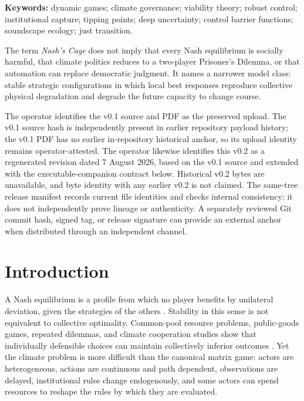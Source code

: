 \documentclass[11pt,a4paper]{article}
\numberwithin{equation}{section}
\theoremstyle{definition}
\theoremstyle{plain}
\theoremstyle{remark}
\begin{document}
\noindent\textbf{Keywords:} dynamic games; climate governance; viability theory; robust control; institutional capture; tipping points; deep uncertainty; control barrier functions; soundscape ecology; just transition.

\vspace{0.8em}
\begin{boundarybox}
The term \emph{Nash's Cage} does not imply that every Nash equilibrium is socially harmful, that climate politics reduces to a two-player Prisoner's Dilemma, or that automation can replace democratic judgment. It names a narrower model class: stable strategic configurations in which local best responses reproduce collective physical degradation and degrade the future capacity to change course.
\end{boundarybox}

\begin{provenancebox}
The operator identifies the v0.1 source and PDF as the preserved upload. The v0.1 source hash is independently present in earlier repository payload history; the v0.1 PDF has no earlier in-repository historical anchor, so its upload identity remains operator-attested. The operator likewise identifies this v0.2 as a regenerated revision dated 7 August 2026, based on the v0.1 source and extended with the executable-companion contract below. Historical v0.2 bytes are unavailable, and byte identity with any earlier v0.2 is not claimed. The same-tree release manifest records current file identities and checks internal consistency; it does not independently prove lineage or authenticity. A separately reviewed Git commit hash, signed tag, or release signature can provide an external anchor when distributed through an independent channel.
\end{provenancebox}

{\small\tableofcontents}
\newpage

\section{Introduction}

A Nash equilibrium is a profile from which no player benefits by unilateral deviation, given the strategies of the others \citep{nash1950}. Stability in this sense is not equivalent to collective optimality. Common-pool resource problems, public-goods games, repeated dilemmas, and climate cooperation studies show that individually defensible choices can maintain collectively inferior outcomes \citep{hardin1968,axelrod1984,ostrom1990,milinski2008,nordhaus2015}. Yet the climate problem is more difficult than the canonical matrix game: actors are heterogeneous, actions are continuous and path dependent, observations are delayed, institutional rules change endogenously, and some actors can spend resources to reshape the rules by which they are evaluated.
\end{document}
